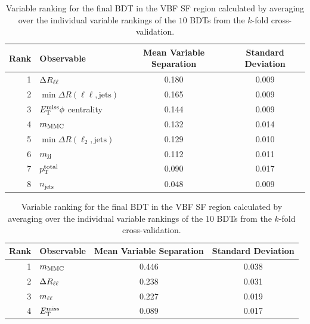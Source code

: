 \begin{table}[htpb]
    \centering
    \caption{Variable ranking for the final BDT in the VBF SF region calculated by averaging over the individual
             variable rankings of the $10$ BDTs from the $k$-fold cross-validation.}\label{tab:mva:variables:ranking:VBFDF}
    \begin{tabular}{rlcc}
        \toprule
        Rank & Observable & Mean Variable Separation & Standard Deviation \\ \midrule
        1 & $\Delta R_{\ell\ell}$ & 0.180 & 0.009 \\
        2 & $\min \Delta R (\ell\ell, \text{jets})$ & 0.165 & 0.009 \\
        3 & $E_\text{T}^\text{miss} \phi$ centrality & 0.144 & 0.009 \\
        4 & $m_\text{MMC}$ & 0.132 & 0.014 \\
        5 & $\min \Delta R (\ell_2, \text{jets})$ & 0.129 & 0.010 \\
        6 & $m_{\text{jj}}$ & 0.112 & 0.011 \\
        7 & $p_\text{T}^\text{total}$ & 0.090 & 0.017 \\
        8 & $n_\text{jets}$ & 0.048 & 0.009 \\
        \bottomrule
    \end{tabular}
\end{table}
\begin{table}[htpb]
    \centering
    \caption{Variable ranking for the final BDT in the VBF SF region calculated by averaging over the individual
             variable rankings of the $10$ BDTs from the $k$-fold cross-validation.}\label{tab:mva:variables:ranking:BOOSTSF}
    \begin{tabular}{rlcc}
        \toprule
        Rank & Observable & Mean Variable Separation & Standard Deviation \\ \midrule
        1 & $m_\text{MMC}$ & 0.446 & 0.038 \\
        2 & $\Delta R_{\ell\ell}$ & 0.238 & 0.031 \\
        3 & $m_{\ell\ell}$ & 0.227 & 0.019 \\
        4 & $E_\text{T}^\text{miss}$ & 0.089 & 0.017 \\
        \bottomrule
    \end{tabular}
\end{table}
